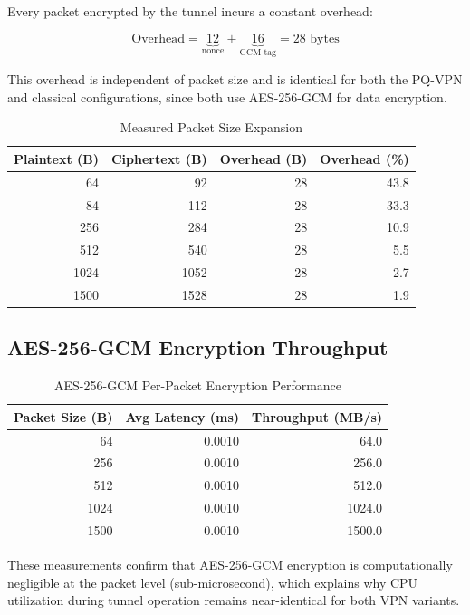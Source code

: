 \documentclass[conference]{IEEEtran}
\begin{document}
Every packet encrypted by the tunnel incurs a constant overhead:

\begin{equation}
\text{Overhead} = \underbrace{12}_{\text{nonce}} + \underbrace{16}_{\text{GCM tag}} = 28 \text{ bytes}
\end{equation}

This overhead is independent of packet size and is identical for both the PQ-VPN and classical configurations, since both use AES-256-GCM for data encryption.

\begin{table}[H]
\centering
\caption{Measured Packet Size Expansion}
\label{tab:overhead}
\begin{tabular}{rrrr}
\toprule
\textbf{Plaintext (B)} & \textbf{Ciphertext (B)} & \textbf{Overhead (B)} & \textbf{Overhead (\%)} \\
\midrule
64   & 92   & 28 & 43.8 \\
84   & 112  & 28 & 33.3 \\
256  & 284  & 28 & 10.9 \\
512  & 540  & 28 &  5.5 \\
1024 & 1052 & 28 &  2.7 \\
1500 & 1528 & 28 &  1.9 \\
\bottomrule
\end{tabular}
\end{table}

\subsection{AES-256-GCM Encryption Throughput}

\begin{table}[H]
\centering
\caption{AES-256-GCM Per-Packet Encryption Performance}
\label{tab:aes}
\begin{tabular}{rrr}
\toprule
\textbf{Packet Size (B)} & \textbf{Avg Latency (ms)} & \textbf{Throughput (MB/s)} \\
\midrule
64   & 0.0010 &   64.0 \\
256  & 0.0010 &  256.0 \\
512  & 0.0010 &  512.0 \\
1024 & 0.0010 & 1024.0 \\
1500 & 0.0010 & 1500.0 \\
\bottomrule
\end{tabular}
\end{table}

These measurements confirm that AES-256-GCM encryption is computationally negligible at the packet level (sub-microsecond), which explains why CPU utilization during tunnel operation remains near-identical for both VPN variants.
\end{document}

